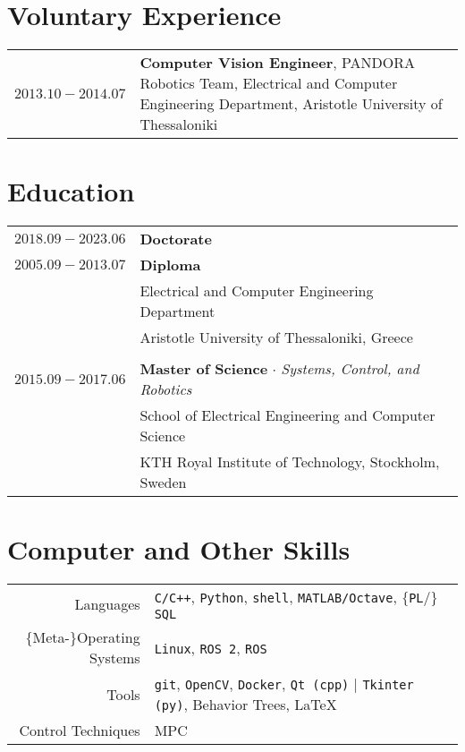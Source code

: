 \documentclass[a4paper,10pt,twoside]{article}
\begin{document}
\section{Voluntary Experience}

\begin{tabular}{rp{12cm}}
$2013.10 - 2014.07$ & \textbf{Computer Vision Engineer}, PANDORA Robotics Team,
Electrical and Computer Engineering Department, Aristotle University of Thessaloniki
\end{tabular}



\section{Education}

\begin{tabular}{rp{12cm}}
$2018.09 - 2023.06$ & \textbf{Doctorate} \\
$2005.09 - 2013.07$ & \textbf{Diploma} \\
                    & Electrical and Computer Engineering Department\\
                    & Aristotle University of Thessaloniki, Greece \\
&\\
$2015.09 - 2017.06$ & \textbf{Master of Science} $\cdot$ \textit{Systems, Control, and Robotics}\\
                    & School of Electrical Engineering and Computer Science\\
                    & KTH Royal Institute of Technology, Stockholm, Sweden\\
\end{tabular}


\section{Computer and Other Skills}

\begin{tabular}{rp{12cm}}
Languages & \texttt{C/C++}, \texttt{Python}, \texttt{shell}, \texttt{MATLAB/Octave}, $\{$\texttt{PL}/$\}$\texttt{SQL}\\
$\{$Meta-$\}$Operating Systems & \texttt{Linux}, \texttt{ROS 2}, \texttt{ROS} \\
Tools & \texttt{git}, \texttt{OpenCV}, \texttt{Docker}, \texttt{Qt (cpp)} | \texttt{Tkinter (py)}, Behavior Trees, \LaTeX \\
Control Techniques & MPC \\
\end{tabular}
\end{document}
